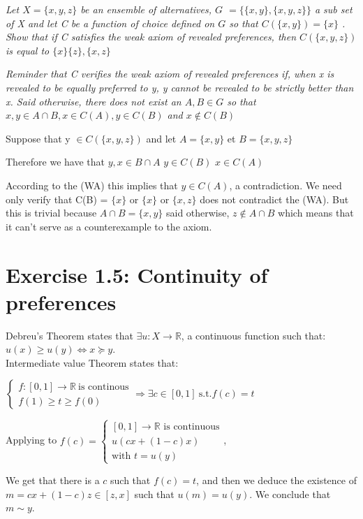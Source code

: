 \documentclass[11pt]{article} %
\begin{document}
\textit{Let $ X = \{ x,y,z \} $ be an ensemble of alternatives, $ G $ $ = \{\{x,y\},\{x,y,z \} \} $ a sub set of X and let C be a function of choice defined on $ G $ so that $C(\{ x,y \}) = \{ x\}$ . Show that if C satisfies the weak axiom of revealed preferences, then $C(\{x,y,z \})$ is equal to $\{x \} \{z \}, \{x,z \}$}

\textit{Reminder that C verifies the weak axiom of revealed preferences if, when x is revealed to be equally preferred to y, y cannot be revealed to be strictly better than x. Said otherwise, there does not exist an $ A,B \in G $ so that $x, y \in A \cap B, x \in C(A), y \in C(B)$ and $x \notin C(B) $}

Suppose that y $\in C(\{ x,y,z \})$ and let $A = \{x, y \}$ et $B = \{x, y, z \}$

Therefore we have that $y,x \in B \cap A $
$y \in C(B)$
$x \in C(A)$

According to the (WA) this implies that $y \in C(A)$, a contradiction.
We need only verify that C(B) = $\{x \}$ or  $\{x \}$ or $\{x,z \}$ does not contradict the (WA). But this is trivial because $A \cap B = \{x,y \}$ said otherwise, $z \notin A \cap B $ which means that it can't serve as a counterexample to the axiom. 

\section*{Exercise 1.5: Continuity of preferences}

Debreu's Theorem states that $\exists u:X \rightarrow \mathbb{R} $, a continuous function such that: $ u(x) \geq u(y) \Leftrightarrow x \succeq y $. \\

Intermediate value Theorem states that:

$\begin{cases}
f : [0,1] \rightarrow \mathbb{R} \ \textrm{is continous} \\
f(1) \geq t \geq f(0)
\end{cases}
\Rightarrow \exists c \in [0,1] \ \textrm{s.t.} f(c) = t $

Applying to $f(c) = \begin{cases}
[0,1] \rightarrow \mathbb{R}  \textrm{ is continuous} \\
u(cx + (1-c)x)\\
 \textrm{with } t = u(y)
\end{cases}  $, 

We get that there is a $ c$ such that $f(c) = t  $, and then we deduce the existence of $m = cx +(1-c)z \in [z,x]$ such that $u(m) = u(y) $. We conclude that $m \sim y $.
\end{document}
